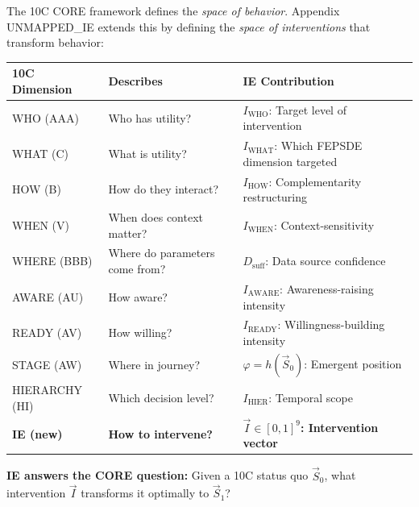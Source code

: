 
\begin{tcolorbox}[colback=red!5!white, colframe=red!75!black,
    title=\textbf{CORE Connection: IE as the 10th CORE Dimension}]

The 10C CORE framework defines the \textit{space of behavior}. Appendix UNMAPPED_IE extends this by defining the \textit{space of interventions} that transform behavior:

\begin{center}
\renewcommand{\arraystretch}{1.3}
\begin{tabular}{@{}lll@{}}
\toprule
\textbf{10C Dimension} & \textbf{Describes} & \textbf{IE Contribution} \\
\midrule
WHO (AAA) & Who has utility? & $I_{\text{WHO}}$: Target level of intervention \\
WHAT (C) & What is utility? & $I_{\text{WHAT}}$: Which FEPSDE dimension targeted \\
HOW (B) & How do they interact? & $I_{\text{HOW}}$: Complementarity restructuring \\
WHEN (V) & When does context matter? & $I_{\text{WHEN}}$: Context-sensitivity \\
WHERE (BBB) & Where do parameters come from? & $D_{\text{suff}}$: Data source confidence \\
AWARE (AU) & How aware? & $I_{\text{AWARE}}$: Awareness-raising intensity \\
READY (AV) & How willing? & $I_{\text{READY}}$: Willingness-building intensity \\
STAGE (AW) & Where in journey? & $\varphi = h(\vec{S}_0)$: Emergent position \\
HIERARCHY (HI) & Which decision level? & $I_{\text{HIER}}$: Temporal scope \\
\midrule
\textbf{IE (new)} & \textbf{How to intervene?} & \textbf{$\vec{I} \in [0,1]^9$: Intervention vector} \\
\bottomrule
\end{tabular}
\end{center}

\textbf{IE answers the CORE question:} Given a 10C status quo $\vec{S}_0$, what intervention $\vec{I}$ transforms it optimally to $\vec{S}_1$?
\end{tcolorbox}


